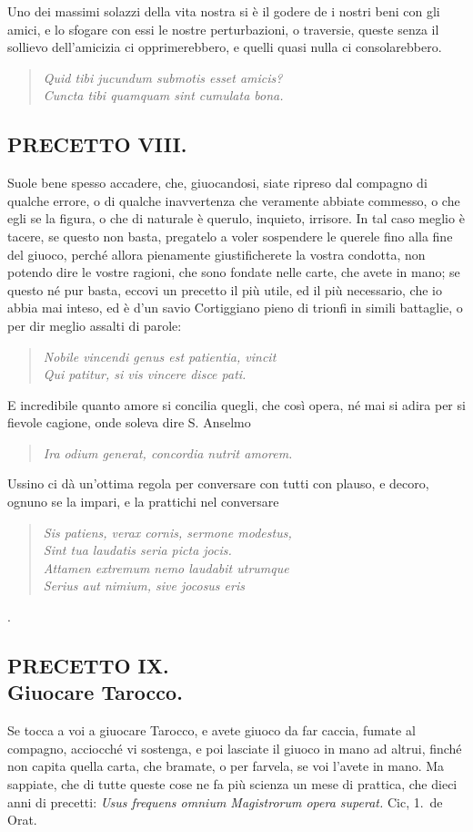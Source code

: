 \documentclass[11pt,a6paper]{article}
\newcommand{\literaryquote}[1]{%
\kern -6pt  \begin{verse}
    {\footnotesize \it #1}
  \end{verse}\kern -2pt%
}
\begin{document}
{Uno dei massimi solazzi della vita nostra si è il
godere de i nostri beni con gli amici, e lo sfogare con
essi le nostre perturbazioni, o traversie, queste
senza il sollievo dell'amicizia ci opprimerebbero, e
quelli quasi nulla ci consolarebbero.
\literaryquote{
Quid tibi jucundum submotis esset amicis?\\
Cuncta tibi quamquam sint cumulata bona.}

}

\subsection{PRECETTO VIII.}

Suole bene spesso accadere, che, giuocandosi,
siate ripreso dal compagno di qualche
errore, o di qualche inavvertenza che
veramente abbiate commesso, o che egli se la
figura, o che di naturale è querulo, inquieto,
irrisore. In tal caso meglio è tacere, se
questo non basta, pregatelo a voler sospendere
le querele fino alla fine del giuoco, perché
allora pienamente giustificherete la vostra
condotta, non potendo dire le vostre ragioni,
che sono fondate nelle carte, che avete in
mano; se questo né pur basta, eccovi un
precetto il più utile, ed il più necessario, che io
abbia mai inteso, ed è d'un savio Cortiggiano
pieno di trionfi in simili battaglie, o per
dir meglio assalti di parole:
\literaryquote{Nobile vincendi genus est patientia, vincit\\
Qui patitur, si vis vincere disce pati.}

E incredibile quanto amore si concilia quegli,
che così opera, né mai si adira per si fievole
cagione, onde soleva dire S. Anselmo
\literaryquote{Ira odium generat, concordia nutrit amorem.}

Ussino ci dà un'ottima regola per conversare
con tutti con plauso, e decoro, ognuno se la
impari, e la prattichi nel conversare
\literaryquote{Sis patiens, verax cornis, sermone modestus,\\
Sint tua laudatis seria picta jocis.\\
Attamen extremum nemo laudabit utrumque\\
Serius aut nimium, sive jocosus eris}.


\subsection{PRECETTO IX.\\
 \footnotesize Giuocare Tarocco.}

Se tocca a voi a giuocare Tarocco, e avete
giuoco da far caccia, fumate al compagno,
acciocché vi sostenga, e poi lasciate il
giuoco in mano ad altrui, finché non capita
quella carta, che bramate, o per farvela, se
voi l'avete in mano. Ma sappiate, che di
tutte queste cose ne fa più scienza un mese di
prattica, che dieci anni di precetti: \textit{Usus
frequens omnium Magistrorum opera superat.}
Cic, 1.\ de Orat.
\end{document}
